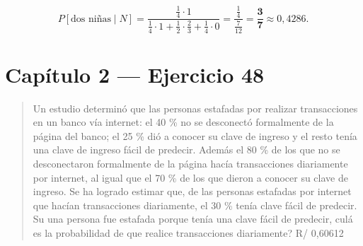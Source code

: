 \documentclass[11pt]{article}
\begin{document}
\begin{resp}
\[
P[\text{dos ni\~nas}\mid N]=\frac{\tfrac14\cdot 1}{\tfrac14\cdot 1+\tfrac12\cdot\tfrac23+\tfrac14\cdot 0}
=\frac{\tfrac14}{\tfrac{7}{12}}=\mathbf{\frac{3}{7}}\approx 0{,}4286 .
\]
\end{resp}

\section*{Cap\'itulo 2 --- Ejercicio 48}

\begin{quote}
Un estudio determin\'o que las personas estafadas por realizar transacciones en un banco v\'ia internet: el 40 \% no se desconect\'o formalmente de la p\'agina del banco; el 25 \% di\'o a conocer su clave de ingreso y el resto ten\'ia una clave de ingreso f\'acil de predecir. Adem\'as el 80 \% de los que no se desconectaron formalmente de la p\'agina hac\'ia transacciones diariamente por internet, al igual que el 70 \% de los que dieron a conocer su clave de ingreso. Se ha logrado estimar que, de las personas estafadas por internet que hac\'ian transacciones diariamente, el 30 \% ten\'ia clave f\'acil de predecir. Su una persona fue estafada porque ten\'ia una clave f\'acil de predecir, cul\'a es la probabilidad de que realice transacciones diariamente? \hfill R/ 0,60612
\end{quote}
\end{document}
